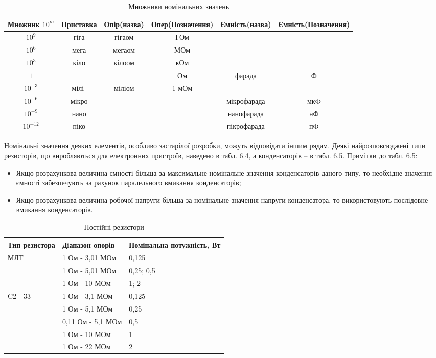 \documentclass[main.tex]{subfiles}
\begin{document}
\begin{table}[H]
\centering
\caption{Множники номінальних значень}
\label{tab:multipliers}
\footnotesize
\begin{tabular}{|c|c|c|c|c|c|}
\hline
Множник $10^m$ & Приставка & Опір(назва) & Опер(Позначення) & Ємність(назва) & Ємність(Позначення) \\
\hline
$10^{9}$ & гіга & гігаом & ГОм & & \\
$10^{6}$ & мега & мегаом & МОм & & \\
$10^{3}$ & кіло & кілоом & кОм & & \\
$1$ & &         & Ом & фарада & Ф \\
$10^{-3}$ & мілі- & міліом & 1 мОм & & \\
$10^{-6}$ & мікро & & & мікрофарада & мкФ \\
$10^{-9}$ & нано & & & нанофарада & нФ \\
$10^{-12}$ & піко & & & пікрофарада & пФ \\
\hline
\end{tabular}
\normalsize
\end{table}

Номінальні значення деяких елементів, особливо застарілої розробки,
можуть відповідати іншим рядам.
Деякі найрозповсюджені типи резисторів, що виробляються для
електронних пристроїв, наведено в табл. 6.4, а конденсаторів – в табл. 6.5.
Примітки до табл. 6.5:
\begin{itemize}
    \item Якщо розрахункова величина ємності більша за максимальне номінальне
значення конденсаторів даного типу, то необхідне значення ємності забезпечують
за рахунок паралельного вмикання конденсаторів;
    \item Якщо розрахункова величина робочої напруги більша за номінальне
значення напруги конденсатора, то використовують послідовне вмикання
конденсаторів.
\end{itemize}

\begin{table}[H]
\centering
\caption{Постійні резистори}
\label{tab:resistor_types}
\footnotesize
\begin{tabular}{|p{3cm}|p{3cm}|p{3cm}|}
\hline
\textbf{Тип резистора} & \textbf{Діапазон опорів} & \textbf{Номінальна потужність, Вт} \\
\hline
МЛТ & 1 Ом - 3,01 МОм & 0,125 \\
 & 1 Ом - 5,01 МОм & 0,25; 0,5 \\
 & 1 Ом - 10 МОм & 1; 2 \\
\hline
C2 - 33 & 1 Ом - 3,1 МОм & 0,125 \\
        & 1 Ом - 5,1 МОм & 0,25 \\
        & 0,11 Ом - 5,1 МОм & 0,5 \\
        & 1 Ом - 10 МОм & 1 \\
        & 1 Ом - 22 МОм & 2 \\
\hline
\end{tabular}
\normalsize
\end{table}
\end{document}
